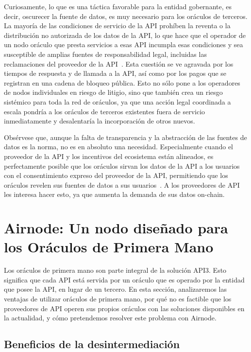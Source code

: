 \documentclass[11pt]{article}
\begin{document}
Curiosamente, lo que es una táctica favorable para la entidad gobernante, es decir, oscurecer la fuente de datos, es muy necesario para los oráculos de terceros. La mayoría de las condiciones de servicio de la API prohíben la reventa o la distribución no autorizada de los datos de la API, lo que hace que el operador de un nodo oráculo que presta servicios a esas API incumpla esas condiciones y sea susceptible de amplias fuentes de responsabilidad legal, incluidas las reclamaciones del proveedor de la API~\cite{data-licensing}.
Esta cuestión se ve agravada por los tiempos de respuesta y de llamada a la API, así como por los pagos que se registran en una cadena de bloqueo pública. Esto no sólo pone a los operadores de nodos individuales en riesgo de litigio, sino que también crea un riesgo sistémico para toda la red de oráculos, ya que una acción legal coordinada a escala pondría a los oráculos de terceros existentes fuera de servicio inmediatamente y desalentaría la incorporación de otros nuevos. 

Obsérvese que, aunque la falta de transparencia y la abstracción de las fuentes de datos es la norma, no es en absoluto una necesidad. Especialmente cuando el proveedor de la API y los incentivos del ecosistema están alineados, es perfectamente posible que los oráculos sirvan los datos de la API a los usuarios con el consentimiento expreso del proveedor de la API, permitiendo que los oráculos revelen sus fuentes de datos a sus usuarios~\cite{honeycomb.market}.
A los proveedores de API les interesa hacer esto, ya que aumenta la demanda de sus datos on-chain.

\section{Airnode: Un nodo diseñado para los Oráculos de Primera Mano}
\label{sec:airnode-a-node-designed-for-first-party-oracles}

Los oráculos de primera mano son parte integral de la solución API3. Esto significa que cada API está servida por un oráculo que es operado por la entidad que posee la API, en lugar de un tercero. En esta sección, analizaremos las ventajas de utilizar oráculos de primera mano, por qué no es factible que los proveedores de API operen sus propios oráculos con las soluciones disponibles en la actualidad, y cómo pretendemos resolver este problema con Airnode.

\subsection{Beneficios de la desintermediación}
\label{sec:benefits-of-disintermediation}
\end{document}
